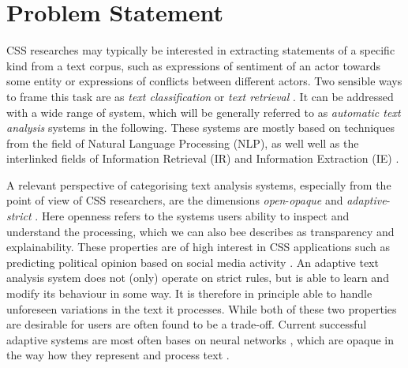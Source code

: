 \documentclass[11pt]{scrreprt}
\let\cite\parencite  %
\begin{document}



%

\chapter{Problem Statement}
\label{cha:problem-statement}
CSS researches may typically be interested in extracting statements of a specific kind from a text corpus, such as expressions of sentiment of an actor towards some entity or expressions of conflicts between different actors. Two sensible ways to frame this task are as \textit{text classification} \cite{kowsariTextClassificationAlgorithms2019} or \textit{text retrieval} \cite{manningIntroductionInformationRetrieval2008}. It can be addressed with a wide range of system, which will be generally referred to as  \textit{automatic text analysis} systems in the following. These systems are mostly based on techniques from the field of Natural Language Processing (NLP), as well well as the interlinked fields of Information Retrieval (IR) and Information Extraction (IE) \cite{chowdharyNaturalLanguageProcessing2020}.

A relevant perspective of categorising text analysis systems, especially from the point of view of CSS researchers, are the dimensions \textit{open}-\textit{opaque} and \textit{adaptive}-\textit{strict} \cite{menezesSemanticHypergraphs2021}. Here openness refers to the systems users ability to inspect and understand the processing, which we can also bee describes as transparency and explainability. These properties are of high interest in CSS applications such as predicting political opinion based on social media activity \cite{wilkersonLargeScaleComputerizedText2017}. An adaptive text analysis system does not (only) operate on strict rules, but is able to learn and modify its behaviour in some way. It is therefore in principle able to handle unforeseen variations in the text it processes. While both of these two properties are desirable for users are often found to be a trade-off. Current successful adaptive systems are most often bases on neural networks \cite{hirschbergAdvancesNaturalLanguage2015}, which are opaque in the way how they represent and process text \cite{rudinStopExplainingBlack2019}. 
\end{document}
